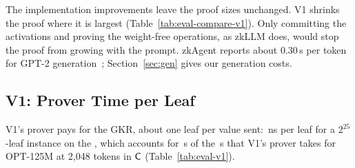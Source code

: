  The implementation improvements leave the proof sizes unchanged. V1 shrinks
the proof where it is largest (Table~\ref{tab:eval-compare-v1}). Only committing the activations and
proving the weight-free operations, as zkLLM does, would stop the proof from growing with the
prompt. zkAgent reports about 0.30\,s per token for GPT-2
generation~\cite{zkagent}; Section~\ref{sec:gen} gives our generation costs.

\subsection{V1: Prover Time per Leaf}
\label{app:eval-gkr-leaf}

V1's prover pays for the GKR, about one leaf per value sent: \GkrNsPerLeaf{}\,ns per leaf for a
$2^{25}$-leaf instance on the \PlatformGpu{}, which accounts for \VOneOptSGkr{}\,s of the \VOneOptSProveVOne{}\,s that V1's
prover takes for OPT-125M at 2{,}048 tokens in $\mathsf{C}$ (Table~\ref{tab:eval-v1}).
